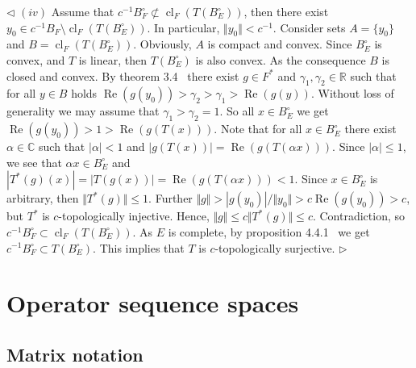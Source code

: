 \documentclass[12pt]{article}
\newenvironment{proof}{\par $\triangleleft$}{$\triangleright$}
\begin{document}
\begin{proof}
$(iv)$ Assume that 
$c^{-1}B_F^\circ\not\subset\operatorname{cl}_F( T(B_E^\circ))$, then there exist
$y_0\in c^{-1}B_F\setminus\operatorname{cl}_F( T(B_E^\circ))$.
In particular, $\Vert y_0\Vert<c^{-1}$. Consider sets $A= \{y_0 \}$ and
$B=\operatorname{cl}_F( T(B_E^\circ))$. Obviously, $A$ is compact and convex.
Since  $B_E^\circ$ is convex, and $ T$ is linear, then $ T(B_E^\circ)$ is also
convex. As the consequence $B$ is closed and convex. 
By theorem 3.4~\cite{RudinFA}  
there exist $g\in F^*$ and $\gamma_1,\gamma_2\in\mathbb{R}$ such that 
for all $y\in B$ holds 
$\operatorname{Re}(g(y_0))>\gamma_2>\gamma_1>\operatorname{Re}(g(y))$. Without
loss of generality we may assume that $\gamma_1>\gamma_2=1$. So all $x\in
B_E^\circ$ we get $\operatorname{Re}(g(y_0))>1>\operatorname{Re}(g( T(x)))$.
Note that for all $x\in B_E^\circ$ there exist $\alpha\in\mathbb{C}$ such that
$|\alpha|<1$ and $|g( T(x))|=\operatorname{Re}(g(T(\alpha x)))$. Since
$|\alpha|\leq 1$, we see that $\alpha x\in B_E^\circ$ and $| T^*(g)(x)|=|
T(g(x))|=\operatorname{Re}(g( T(\alpha x)))<1$. Since $x\in B_E^\circ$ is
arbitrary, then $\Vert T^*(g)\Vert\leq 1$. Further $\Vert g\Vert>|g(y_0)|/\Vert
y_0\Vert>c\operatorname{Re}(g(y_0))>c$, but $ T^*$ is $c$-topologically
injective. Hence, $\Vert g\Vert\leq c\Vert T^*(g)\Vert\leq c$. Contradiction, so
$c^{-1}B_F^\circ\subset \operatorname{cl}_F(T(B_E^\circ))$. As $E$ is complete,
by proposition 4.4.1~\cite{HelFA} we get $c^{-1}B_F^\circ\subset T(B_E^\circ)$.
This implies that $T$ is $c$-topologically surjective.
\end{proof}





























\section{Operator sequence spaces}

\subsection{Matrix notation}
\end{document}
